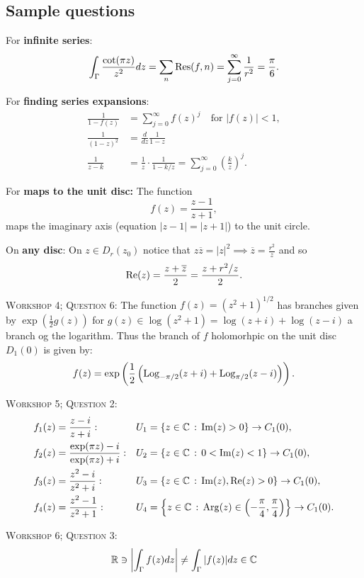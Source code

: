 \noindent\dotfill
\begin{multicols}{2}
\section*{Sample questions}

For \textbf{infinite series}:
    \[
    \int_\Gamma \frac{\cot(\pi z)}{z^2}dz 
    = \sum_n \mathrm{Res}(f,n) 
    = \sum_{j=0}^\infty \frac{1}{r^2} = \frac{\pi}{6}.
    \]

For \textbf{finding series expansions}:
    \begin{align*}
    \frac{1}{1-f(z)} &= \sum_{j=0}^\infty f(z)^j \quad \text{for }|f(z)|<1, \\
    \frac{1}{(1-z)^2} &= \frac{d}{dz}\frac{1}{1-z} \\
    \frac{1}{z-k} &= \frac{1}{z}\cdot\frac{1}{1-k/z}
    = \sum_{j=0}^\infty \left(\frac{k}{z}\right)^j.
    \end{align*}

For \textbf{maps to the unit disc:} The function
    \[
    f(z)=\frac{z-1}{z+1},
    \]
maps the imaginary axis (equation $|z-1|=|z+1|$) to the unit circle.

On \textbf{any disc}: On $z\in D_r(z_0)$ notice that $z\overline{z}=|z|^2\implies \overline{z}=\frac{r^2}{z}$ and so
    \[
    \mathrm{Re}(z) = \frac{z+\overline{z}}{2} = \frac{z+r^2/z}{2}.
    \]


\textsc{Workshop 4; Question 6}:  The function $f(z)=(z^2+1)^{1/2}$ has branches given by $\exp(\frac{1}{2}g(z))$ for $g(z)\in\log(z^2+1) = \log(z+i) + \log(z-i)$ a branch og the logarithm. Thus the branch of $f$ holomorhpic on the unit disc $D_1(0)$ is given by:
    \[
    f(z) = \exp\left(\frac{1}{2}\left(\mathrm{Log}_{-\pi/2}(z+i) + \mathrm{Log}_{\pi/2}(z-i)\right)\right).
    \]
    
\textsc{Workshop 5; Question 2}:
    \begin{align*}
        f_{1}(z) &= \frac{z-i}{z+i}:
          &&U_1= \{z\in\mathbb{C}\,:\,\mathrm{Im}(z)>0\}\to C_1(0), \\
        f_{2}(z) &= \frac{\exp(\pi z)-i}{\exp(\pi z)+i}:
          &&U_2 = \{z\in\mathbb{C}\,:\,0<\mathrm{Im}(z)<1\}\to C_1(0),  \\
        f_{3}(z) &= \frac{z^2-i}{z^2+i}:
          &&U_3 = \{z\in\mathbb{C}\,:\,\mathrm{Im}(z),\mathrm{Re}(z)>0\}\to C_1(0),  \\
        f_{4}(z) &= \frac{z^2-1}{z^2+1}:
          &&U_4 = \left\{z\in\mathbb{C}\,:\,\mathrm{Arg}(z)\in\left(-\frac{\pi}{4},\frac{\pi}{4}\right)\right\}\to C_1(0).\\
    \end{align*}
    
\textsc{Workshop 6; Question 3:}
    \[
    \mathbb{R}\ni\left| \int_\Gamma f(z) dz\right| \neq \int_\Gamma |f(z)|dz \in\mathbb{C}
    \]

\end{multicols}